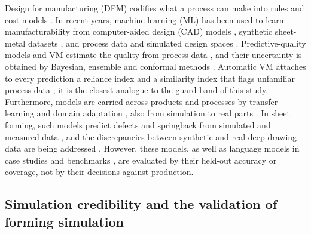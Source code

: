 \documentclass[pdflatex,sn-basic,lineno]{sn-jnl}
\begin{document}
Design for manufacturing (DFM) codifies what a process can make into rules and cost models \citep{boothroyd2010product}. In recent years, machine learning (ML) has been used to learn manufacturability from computer-aided design (CAD) models \citep{ghadai2018learning, zhang2018featurenet}, synthetic sheet-metal datasets \citep{ballegeer2026bendfm}, and process data and simulated design spaces \citep{yan2026machine}. Predictive-quality models and VM estimate the quality from process data \citep{wuest2016machine, tercan2022machine, dreyfus2022virtual}, and their uncertainty is obtained by Bayesian, ensemble and conformal methods \citep{nemani2023uncertainty, heddoub2026conformal}. Automatic VM attaches to every prediction a reliance index and a similarity index that flags unfamiliar process data \citep{cheng2008evaluating, cheng2012developing}; it is the closest analogue to the guard band of this study. Furthermore, models are carried across products and processes by transfer learning and domain adaptation \citep{maschler2021deep}, also from simulation to real parts \citep{tercan2018transfer}. In sheet forming, such models predict defects and springback from simulated and measured data \citep{cao2024artificial, heinzelmann2025datadriven}, and the discrepancies between synthetic and real deep-drawing data are being addressed \citep{baum2026addressing}. However, these models, as well as language models in case studies \citep{makatura2024how} and benchmarks \citep{picard2025concept}, are evaluated by their held-out accuracy or coverage, not by their decisions against production.

\subsection{Simulation credibility and the validation of forming simulation}
\end{document}
